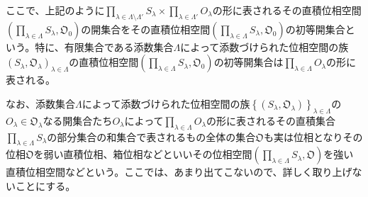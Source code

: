 \documentclass[dvipdfmx]{jsarticle}
\begin{document}
ここで、上記のように$\prod_{\lambda \in \varLambda \setminus \varLambda'} S_{\lambda} \times \prod_{\lambda \in \varLambda'} O_{\lambda}$の形に表されるその直積位相空間$\left( \prod_{\lambda \in \varLambda} S_{\lambda},\mathfrak{O}_{0} \right)$の開集合をその直積位相空間$\left( \prod_{\lambda \in \varLambda} S_{\lambda},\mathfrak{O}_{0} \right)$の初等開集合という。特に、有限集合である添数集合$\varLambda$によって添数づけられた位相空間の族$\left( S_{\lambda},\mathfrak{O}_{\lambda} \right)_{\lambda \in \varLambda}$の直積位相空間$\left( \prod_{\lambda \in \varLambda} S_{\lambda},\mathfrak{O}_{0} \right)$の初等開集合は$\prod_{\lambda \in \varLambda} O_{\lambda}$の形に表される。\par
なお、添数集合$\varLambda$によって添数づけられた位相空間の族$\left\{ \left( S_{\lambda},\mathfrak{O}_{\lambda} \right) \right\}_{\lambda \in \varLambda}$の$O_{\lambda} \in \mathfrak{O}_{\lambda}$なる開集合たち$O_{\lambda}$によって$\prod_{\lambda \in \varLambda} O_{\lambda}$の形に表されるその直積集合$\prod_{\lambda \in \varLambda} S_{\lambda}$の部分集合の和集合で表されるもの全体の集合$\mathfrak{O}$も実は位相となりその位相$\mathfrak{O}$を弱い直積位相、箱位相などといいその位相空間$\left( \prod_{\lambda \in \varLambda} S_{\lambda},\mathfrak{O} \right)$を強い直積位相空間などという。ここでは、あまり出てこないので、詳しく取り上げないことにする。
\end{document}
